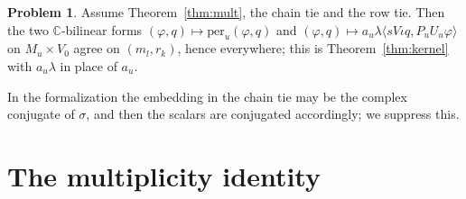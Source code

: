 \documentclass[reqno]{amsart}
\theoremstyle{definition}
\newtheorem{problem}{Problem}[section]
\theoremstyle{plain}
\theoremstyle{remark}
\newcommand{\C}{\mathbb C}
\begin{document}
\begin{problem}\label{pr:kernel-from-mult}
Assume Theorem~\ref{thm:mult}, the chain tie and the row tie.  Then the two \(\C\)-bilinear forms \((\varphi,q)\mapsto\mathrm{per}_u(\varphi,q)\) and \((\varphi,q)\mapsto a_u\lambda\langle sV\iota q,P_uU_u\varphi\rangle\) on \(M_u\times V_0\) agree on \((m_l,r_k)\), hence everywhere; this is Theorem~\ref{thm:kernel} with \(a_u\lambda\) in place of \(a_u\).
\end{problem}

In the formalization the embedding in the chain tie may be the complex conjugate of \(\sigma\), and then the scalars are conjugated accordingly; we suppress this.

\section{The multiplicity identity}\label{sec:mult}
\end{document}
